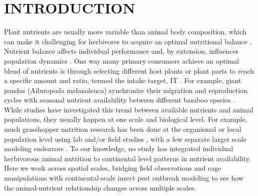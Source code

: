 \documentclass[
]{article}
\begin{document}
\section{INTRODUCTION}\label{introduction}

Plant nutrients are usually more variable than animal body composition,
which can make it challenging for herbivores to acquire an optimal
nutritional balance \citep{elser_nutritional_2000}. Nutrient balance
affects individual performance
\citep{batzli_nutritional_1986, bernays_dietary_1994} and, by extension,
influences population dynamics \citep{elser_nutritional_2000}. One way
many primary consumers achieve an optimal blend of nutrients is through
selecting different host plants or plant parts to reach a specific
amount and ratio, termed the intake target, IT \citep{simpson2012}. For
example, giant pandas (Ailuropoda melanoleuca) synchronize their
migration and reproduction cycles with seasonal nutrient availability
between different bamboo species \citep{nie_obligate_2015}. While
studies have investigated this trend between available nutrients and
animal populations, they usually happen at one scale and biological
level. For example, much grasshopper nutrition research has been done at
the organismal or local population level using lab and/or field studies
\citep{behmer_insect_2009, cease_how_2024, le_gall_global_2019}, with a
few separate larger scale modeling endeavors
\citep{welti_nutrient_2020, zhou_increased_2019}. To our knowledge, no
study has integrated individual herbivorous animal nutrition to
continental level patterns in nutrient availability. Here we work across
spatial scales, bridging field observations and cage manipulations with
continental-scale insect pest outbreak modeling to see how the
animal-nutrient relationship changes across multiple scales.
\end{document}
